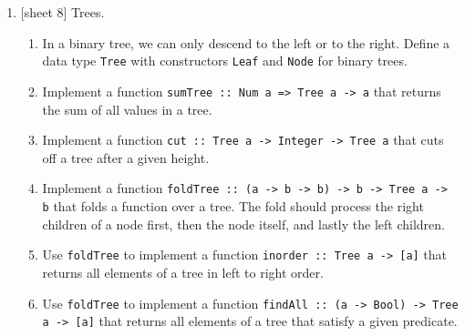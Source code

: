 \documentclass{article}
\def\code#1{\texttt{#1}}
\begin{document}
\begin{enumerate}
    \item {[sheet 8]} Trees.
        \begin{enumerate}
            \item In a binary tree, we can only descend to the left or to the right. Define a data type \code{Tree} with constructors \code{Leaf} and \code{Node} for binary trees.
            \item Implement a function \code{sumTree :: Num a => Tree a -> a} that returns the sum of all values in a tree.
            \item Implement a function \code{cut :: Tree a -> Integer -> Tree a} that cuts off a tree after a given height.
            \item Implement a function \code{foldTree :: (a -> b -> b) -> b -> Tree a -> b} that folds a function over a tree. The fold should process the right children of a node first, then the node itself, and lastly the left children.
            \item Use \code{foldTree} to implement a function \code{inorder :: Tree a -> [a]} that returns all elements of a tree in left to right order.
            \item Use \code{foldTree} to implement a function \code{findAll :: (a -> Bool) -> Tree a -> [a]} that returns all elements of a tree that satisfy a given predicate.
        \end{enumerate}


\end{enumerate}
\end{document}
